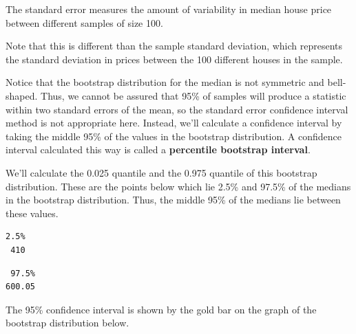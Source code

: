 \documentclass[
  letterpaper,
  DIV=11,
  numbers=noendperiod]{scrreprt}
\newenvironment{Shaded}{\begin{snugshade}}{\end{snugshade}}
\newcommand{\FloatTok}[1]{\textcolor[rgb]{0.68,0.00,0.00}{#1}}
\newcommand{\FunctionTok}[1]{\textcolor[rgb]{0.28,0.35,0.67}{#1}}
\newcommand{\NormalTok}[1]{\textcolor[rgb]{0.00,0.23,0.31}{#1}}
\newcommand{\OtherTok}[1]{\textcolor[rgb]{0.00,0.23,0.31}{#1}}
\newcommand{\SpecialCharTok}[1]{\textcolor[rgb]{0.37,0.37,0.37}{#1}}
\begin{document}
The standard error measures the amount of variability in median house
price between different samples of size 100.

Note that this is different than the sample standard deviation, which
represents the standard deviation in prices between the 100 different
houses in the sample.

Notice that the bootstrap distribution for the median is not symmetric
and bell-shaped. Thus, we cannot be assured that 95\% of samples will
produce a statistic within two standard errors of the mean, so the
standard error confidence interval method is not appropriate here.
Instead, we'll calculate a confidence interval by taking the middle 95\%
of the values in the bootstrap distribution. A confidence interval
calculated this way is called a \textbf{percentile bootstrap interval}.

We'll calculate the 0.025 quantile and the 0.975 quantile of this
bootstrap distribution. These are the points below which lie 2.5\% and
97.5\% of the medians in the bootstrap distribution. Thus, the middle
95\% of the medians lie between these values.

\begin{Shaded}
\end{Shaded}

\begin{verbatim}
2.5% 
 410 
\end{verbatim}

\begin{Shaded}
\end{Shaded}

\begin{verbatim}
 97.5% 
600.05 
\end{verbatim}

The 95\% confidence interval is shown by the gold bar on the graph of
the bootstrap distribution below.
\end{document}
